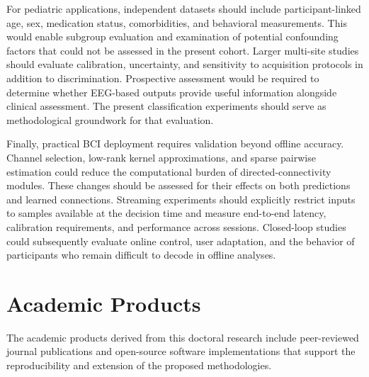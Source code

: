 For pediatric applications, independent datasets should include participant-linked age, sex, medication status, comorbidities, and behavioral measurements. This would enable subgroup evaluation and examination of potential confounding factors that could not be assessed in the present cohort. Larger multi-site studies should evaluate calibration, uncertainty, and sensitivity to acquisition protocols in addition to discrimination. Prospective assessment would be required to determine whether EEG-based outputs provide useful information alongside clinical assessment. The present classification experiments should serve as methodological groundwork for that evaluation.

Finally, practical BCI deployment requires validation beyond offline accuracy. Channel selection, low-rank kernel approximations, and sparse pairwise estimation could reduce the computational burden of directed-connectivity modules. These changes should be assessed for their effects on both predictions and learned connections. Streaming experiments should explicitly restrict inputs to samples available at the decision time and measure end-to-end latency, calibration requirements, and performance across sessions. Closed-loop studies could subsequently evaluate online control, user adaptation, and the behavior of participants who remain difficult to decode in offline analyses.


\section{Academic Products}

The academic products derived from this doctoral research include peer-reviewed journal publications and open-source software implementations that support the reproducibility and extension of the proposed methodologies.

